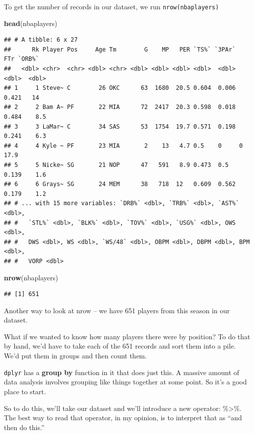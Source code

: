 \documentclass[
]{book}
\newenvironment{Shaded}{\begin{snugshade}}{\end{snugshade}}
\newcommand{\KeywordTok}[1]{\textcolor[rgb]{0.13,0.29,0.53}{\textbf{#1}}}
\newcommand{\NormalTok}[1]{#1}
\begin{document}
To get the number of records in our dataset, we run \texttt{nrow(nbaplayers)}

\begin{Shaded}
\begin{Highlighting}[]
\KeywordTok{head}\NormalTok{(nbaplayers)}
\end{Highlighting}
\end{Shaded}

\begin{verbatim}
## # A tibble: 6 x 27
##      Rk Player Pos     Age Tm        G    MP   PER `TS%` `3PAr`   FTr `ORB%`
##   <dbl> <chr>  <chr> <dbl> <chr> <dbl> <dbl> <dbl> <dbl>  <dbl> <dbl>  <dbl>
## 1     1 Steve~ C        26 OKC      63  1680  20.5 0.604  0.006 0.421   14  
## 2     2 Bam A~ PF       22 MIA      72  2417  20.3 0.598  0.018 0.484    8.5
## 3     3 LaMar~ C        34 SAS      53  1754  19.7 0.571  0.198 0.241    6.3
## 4     4 Kyle ~ PF       23 MIA       2    13   4.7 0.5    0     0       17.9
## 5     5 Nicke~ SG       21 NOP      47   591   8.9 0.473  0.5   0.139    1.6
## 6     6 Grays~ SG       24 MEM      38   718  12   0.609  0.562 0.179    1.2
## # ... with 15 more variables: `DRB%` <dbl>, `TRB%` <dbl>, `AST%` <dbl>,
## #   `STL%` <dbl>, `BLK%` <dbl>, `TOV%` <dbl>, `USG%` <dbl>, OWS <dbl>,
## #   DWS <dbl>, WS <dbl>, `WS/48` <dbl>, OBPM <dbl>, DBPM <dbl>, BPM <dbl>,
## #   VORP <dbl>
\end{verbatim}

\begin{Shaded}
\begin{Highlighting}[]
\KeywordTok{nrow}\NormalTok{(nbaplayers)}
\end{Highlighting}
\end{Shaded}

\begin{verbatim}
## [1] 651
\end{verbatim}

Another way to look at nrow -- we have 651 players from this season in our dataset.

What if we wanted to know how many players there were by position? To do that by hand, we'd have to take each of the 651 records and sort them into a pile. We'd put them in groups and then count them.

\texttt{dplyr} has a \textbf{group by} function in it that does just this. A massive amount of data analysis involves grouping like things together at some point. So it's a good place to start.

So to do this, we'll take our dataset and we'll introduce a new operator: \%\textgreater\%. The best way to read that operator, in my opinion, is to interpret that as ``and then do this.''
\end{document}

